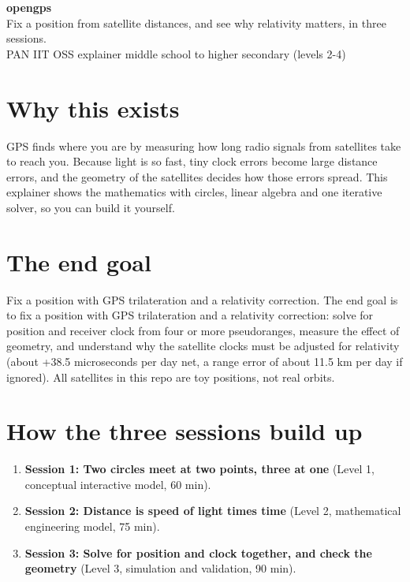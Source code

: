 \documentclass[11pt,a4paper]{article}
\begin{document}
\begin{center}{\LARGE\bfseries opengps}\\[0.4em]{\large Fix a position from satellite distances, and see why relativity matters, in three sessions.}\\[0.2em]\small PAN IIT OSS explainer \textbullet{} middle school to higher secondary (levels 2-4)\end{center}

\section*{Why this exists}
GPS finds where you are by measuring how long radio signals from satellites take to reach you. Because light is so fast, tiny clock errors become large distance errors, and the geometry of the satellites decides how those errors spread. This explainer shows the mathematics with circles, linear algebra and one iterative solver, so you can build it yourself.

\section*{The end goal}
Fix a position with GPS trilateration and a relativity correction. The end goal is to fix a position with GPS trilateration and a relativity correction: solve for position and receiver clock from four or more pseudoranges, measure the effect of geometry, and understand why the satellite clocks must be adjusted for relativity (about +38.5 microseconds per day net, a range error of about 11.5 km per day if ignored). All satellites in this repo are toy positions, not real orbits.

\section*{How the three sessions build up}
\begin{enumerate}[nosep]
\item \textbf{Session 1: Two circles meet at two points, three at one} (Level 1, conceptual interactive model, 60 min).
\item \textbf{Session 2: Distance is speed of light times time} (Level 2, mathematical engineering model, 75 min).
\item \textbf{Session 3: Solve for position and clock together, and check the geometry} (Level 3, simulation and validation, 90 min).
\end{enumerate}
\end{document}
